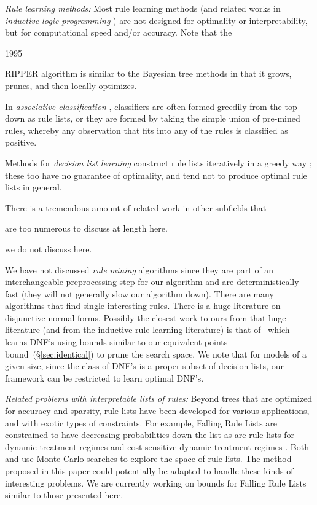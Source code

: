 \textit{Rule learning methods:}
Most rule learning methods (and related works in \textit{inductive logic programming} \citep{muggleton1994inductive}) are not designed for optimality or interpretability, but for computational speed and/or accuracy. Note that the 
\begin{kdd}
1995
\end{kdd}
RIPPER algorithm \citep{ripper} is similar to the Bayesian tree methods in that it grows, prunes, and then locally optimizes.

In \textit{associative classification} \citep{Vanhoof10,Liu98,Li01,Yin03}, classifiers are often formed greedily from the top down as rule lists, or they are formed by taking the simple union of pre-mined rules, whereby any observation that fits into any of the rules is classified as positive.

Methods for \textit{decision list learning} construct rule lists iteratively in a greedy way
\citep{Rivest87,Sokolova03,Marchand05,RudinLeMa13,Goessling2015};
these too have no guarantee of optimality, and tend not to produce optimal rule lists in general.

There is a tremendous amount of related work in other subfields that
\begin{arxiv}
are too numerous to discuss at length here.
\end{arxiv}
\begin{kdd}
we do not discuss here.
\end{kdd}
We have not discussed \textit{rule mining} algorithms since they are part of an interchangeable preprocessing step for our algorithm and are deterministically fast (\ie they will not generally slow our algorithm down). There are many algorithms that find single interesting rules. There is a huge literature on disjunctive normal forms. Possibly the closest work to ours from that huge literature (and from the inductive rule learning literature) is that of~\citet{Rijnbeek10} which learns DNF's using bounds similar to our equivalent points bound~(\S\ref{sec:identical}) to prune the search space.  We note that for models of a given size, since the class of DNF's is a proper subset of decision lists, our framework can be restricted to learn optimal DNF's.

\textit{Related problems with interpretable lists of rules:} Beyond trees that are optimized 
for accuracy and sparsity, rule lists have been developed for various applications,
and with exotic types of constraints.
%
For example, Falling Rule Lists \citep{WangRu15} are constrained to have decreasing probabilities down the list as are rule lists for dynamic treatment regimes \citep{ZhangEtAl15} and cost-sensitive dynamic treatment regimes \citep{LakkarajuRu17}. Both \citet{WangRu15} and \citet{LakkarajuRu17} use Monte Carlo searches to explore the space of rule lists. The method proposed in this paper could potentially be adapted to handle these kinds of interesting problems. We are currently working on bounds for Falling Rule Lists \citep{ChenRu17} similar to those presented here.

